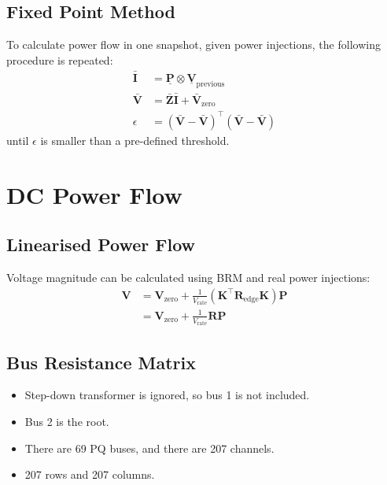 \documentclass[
]{book}
\providecommand{\tightlist}{%
  \setlength{\itemsep}{0pt}\setlength{\parskip}{0pt}}
\begin{document}
\hypertarget{fixed-point-method}{%
\section{Fixed Point Method}\label{fixed-point-method}}

To calculate power flow in one snapshot, given power injections, the following
procedure is repeated:
\[ \begin{aligned}
    \boldsymbol{\bar{I}} &= \boldsymbol{\underline{P}}
      \otimes \boldsymbol{\underline{V}}_\text{previous} \\
    \boldsymbol{\bar{V}}
    &= \boldsymbol{\bar{Z}} \boldsymbol{\bar{I}}
      + \boldsymbol{\bar{V}}_\text{zero} \\
    \epsilon
    &= \left( \boldsymbol{\bar{V}} - \boldsymbol{\bar{V}} \right)^\top
      \left( \boldsymbol{\bar{V}} - \boldsymbol{\bar{V}} \right)
\end{aligned} \]
until \(\epsilon\) is smaller than a pre-defined threshold.

\hypertarget{dc-power-flow}{%
\chapter{DC Power Flow}\label{dc-power-flow}}

\hypertarget{linearised-power-flow}{%
\section{Linearised Power Flow}\label{linearised-power-flow}}

Voltage magnitude can be calculated using BRM and real power injections:
\[ \begin{aligned}
  \boldsymbol{V} &= \boldsymbol{V}_\text{zero} + \frac{1}{V_\text{rate}}
    \left(
      \boldsymbol{K}^{\top} \boldsymbol{R}_\text{edge} \boldsymbol{K}
    \right) \boldsymbol{P} \\
  {} &= \boldsymbol{V}_\text{zero}
      + \frac{1}{V_\text{rate}} \boldsymbol{R} \boldsymbol{P}
\end{aligned} \]

\hypertarget{bus-resistance-matrix}{%
\section{Bus Resistance Matrix}\label{bus-resistance-matrix}}

\begin{itemize}
\tightlist
\item
  Step-down transformer is ignored, so bus 1 is not included.
\item
  Bus 2 is the root.
\item
  There are 69 PQ buses, and there are 207 channels.
\item
  207 rows and 207 columns.
\end{itemize}
\end{document}
